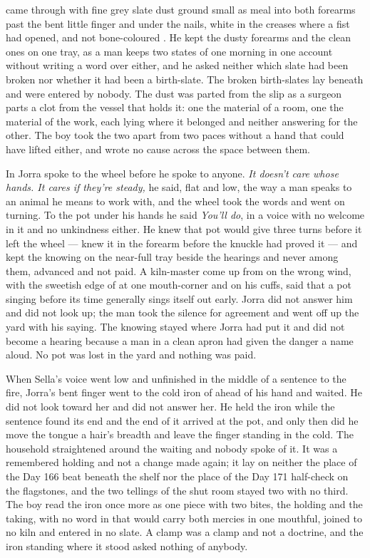  came through with fine grey slate dust ground small as meal into both forearms past the bent little finger and under the nails, white in the creases where a fist had opened, and not bone-coloured . He kept the dusty forearms and the clean ones on one tray, as a man keeps two states of one morning in one account without writing a word over either, and he asked neither which slate had been broken nor whether it had been a birth-slate. The broken birth-slates lay beneath  and were entered by nobody. The dust was parted from the slip as a surgeon parts a clot from the vessel that holds it: one the material of a room, one the material of the work, each lying where it belonged and neither answering for the other. The boy took the two apart from two paces without a hand that could have lifted either, and wrote no cause across the space between them.

\scenebreak

In  Jorra spoke to the wheel before he spoke to anyone. \emph{It doesn't care whose hands. It cares if they're steady,} he said, flat and low, the way a man speaks to an animal he means to work with, and the wheel took the words and went on turning. To the pot under his hands he said \emph{You'll do}, in a voice with no welcome in it and no unkindness either. He knew  that pot would give three turns before it left the wheel --- knew it in the forearm before the knuckle had proved it --- and kept the knowing on the near-full tray beside the hearings and never among them, advanced and not paid. A kiln-master come up from  on the wrong wind, with the sweetish edge of  at one mouth-corner and  on his cuffs, said that a pot singing before its time generally sings itself out early. Jorra did not answer him and did not look up; the man took the silence for agreement and went off up the yard with his saying. The knowing stayed where Jorra had put it and did not become a hearing because a man in a clean apron had given the danger a name aloud. No pot was lost in the yard and nothing was paid.

When Sella's voice went low and unfinished in the middle of a sentence to the fire, Jorra's bent finger went to the cold iron of  ahead of his hand and waited. He did not look toward her and did not answer her. He held the iron while the sentence found its end and the end of it arrived at the pot, and only then did he move the tongue a hair's breadth and leave the finger standing in the cold. The household straightened around the waiting and nobody spoke of it. It was a remembered holding and not a change made again; it lay on neither the place of the Day 166 beat beneath the shelf nor the place of the Day 171 half-check on the flagstones, and the two tellings of the shut room stayed two with no third. The boy read the iron once more as one piece with two bites, the holding and the taking, with no word in  that would carry both mercies in one mouthful, joined to no kiln and entered in no slate. A clamp was a clamp and not a doctrine, and the iron standing where it stood asked nothing of anybody.

